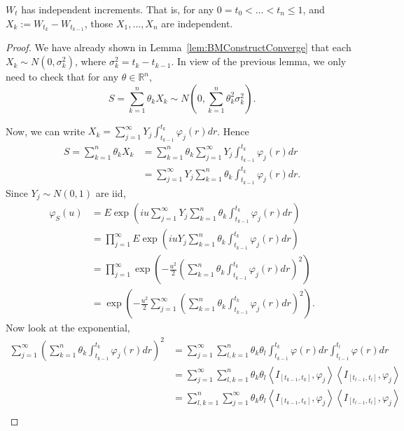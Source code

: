 \begin{lemma}
	$W_t$ has independent increments. That is, for any $0 = t_0 < \ldots < t_n \le 1$, and $X_k := W_{t_k} - W_{t_{k-1}}$, those $X_1,\ldots,X_n$ are independent.
\end{lemma}
\begin{proof}
	We have already shown in Lemma~\ref{lem:BMConstructConverge} that each $X_k\sim N(0, \sigma_k^2)$, where $\sigma_k^2 = t_k - t_{k-1}$. In view of the previous lemma, we only need to check that for any $\theta \in \mathbb{R}^n$, 
	\[
		S = \sum_{k=1}^{n} \theta_k X_k \sim N\left( 0, \sum_{k=1}^{n} \theta_k^2 \sigma_k^2 \right) 
	.\] 

	Now, we can write $X_k = \sum_{j=1}^{\infty} Y_j \int _{t_{k-1}}^{t_k} \varphi_j(r) dr$. Hence
	\begin{align*}
		S = \sum_{k=1}^{n} \theta_k X_k
		&= \sum_{k=1}^{n}  \theta_k \sum_{j=1}^{\infty} Y_j \int _{t_{k-1}}^{t_k} \varphi_j(r) dr \\
		&= \sum_{j=1}^{\infty} Y_j \sum_{k=1}^{n}  \theta_k  \int _{t_{k-1}}^{t_k} \varphi_j(r) dr
	.\end{align*}
	Since $Y_j \sim N(0,1)$ are iid,
	\begin{align*}
		\varphi_S(u) 
		&= E \exp\left( i u \sum_{j=1}^{\infty} Y_j \sum_{k=1}^{n}  \theta_k  \int _{t_{k-1}}^{t_k} \varphi_j(r) dr \right)  \\
		&= \prod_{j = 1}^{\infty} E \exp\left( i u Y_j \sum_{k=1}^{n}  \theta_k  \int _{t_{k-1}}^{t_k} \varphi_j(r) dr \right)   \\
		&= \prod_{j = 1}^{\infty} \exp\left( - \frac{u^2}{2} \left(\sum_{k=1}^{n}  \theta_k  \int _{t_{k-1}}^{t_k} \varphi_j(r) dr \right)^2 \right)   \\
		&= \exp\left( - \frac{u^2}{2} \sum_{j=1}^{\infty} \left(\sum_{k=1}^{n}  \theta_k  \int _{t_{k-1}}^{t_k} \varphi_j(r) dr \right)^2 \right)  
	.\end{align*}
	Now look at the exponential,
	\begin{align*}
		\sum_{j=1}^{\infty} \left(\sum_{k=1}^{n}  \theta_k  \int _{t_{k-1}}^{t_k} \varphi_j(r) dr \right)^2 
		&= \sum_{j=1}^{\infty} \sum_{l,k=1}^{n} \theta_k \theta_l \int _{t_{k-1}}^{t_k} \varphi(r) dr \int _{t_{l - 1}}^{t_l} \varphi(r) dr \\
		&= \sum_{j=1}^{\infty} \sum_{l,k=1}^{n} \theta_k \theta_l \left\langle I_{[t_{k-1}, t_k]}, \varphi_j \right\rangle \left\langle I_{[t_{l-1},  t_l]}, \varphi_j \right\rangle  \\
		&= \sum_{l,k=1}^{n} \sum_{j=1}^{\infty} \theta_k \theta_l \left\langle I_{[t_{k-1}, t_k]}, \varphi_j \right\rangle \left\langle I_{[t_{l-1},  t_l]}, \varphi_j \right\rangle  \\

\end{align*}
\end{proof}
